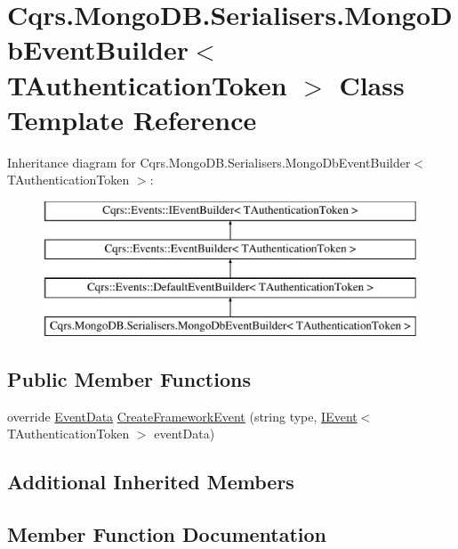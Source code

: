 \hypertarget{classCqrs_1_1MongoDB_1_1Serialisers_1_1MongoDbEventBuilder}{}\section{Cqrs.\+Mongo\+D\+B.\+Serialisers.\+Mongo\+Db\+Event\+Builder$<$ T\+Authentication\+Token $>$ Class Template Reference}
\label{classCqrs_1_1MongoDB_1_1Serialisers_1_1MongoDbEventBuilder}
Inheritance diagram for Cqrs.\+Mongo\+D\+B.\+Serialisers.\+Mongo\+Db\+Event\+Builder$<$ T\+Authentication\+Token $>$\+:\begin{figure}[H]
\begin{center}
\leavevmode
\includegraphics[height=4.000000cm]{classCqrs_1_1MongoDB_1_1Serialisers_1_1MongoDbEventBuilder}
\end{center}
\end{figure}
\subsection*{Public Member Functions}
\begin{DoxyCompactItemize}
\item 
override \hyperlink{classCqrs_1_1Events_1_1EventData}{Event\+Data} \hyperlink{classCqrs_1_1MongoDB_1_1Serialisers_1_1MongoDbEventBuilder_a06afbb994fd3f679f275dea3d1d60c6e}{Create\+Framework\+Event} (string type, \hyperlink{interfaceCqrs_1_1Events_1_1IEvent}{I\+Event}$<$ T\+Authentication\+Token $>$ event\+Data)
\end{DoxyCompactItemize}
\subsection*{Additional Inherited Members}


\subsection{Member Function Documentation}
\mbox{\label{classCqrs_1_1MongoDB_1_1Serialisers_1_1MongoDbEventBuilder_a06afbb994fd3f679f275dea3d1d60c6e}} 

